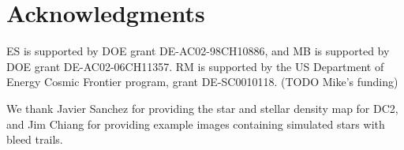 \documentclass[iop, twocolappendix, appendixfloats, numberedappendix, apj]{hackemulateapj}
\begin{document}
%



\section*{Acknowledgments}

ES is supported by DOE grant DE-AC02-98CH10886, and MB is supported by DOE
grant DE-AC02-06CH11357.  RM is supported by the US Department of Energy Cosmic
Frontier program, grant DE-SC0010118.  (TODO Mike's funding)

We thank Javier Sanchez for providing the star and stellar density map for DC2,
and Jim Chiang for providing example images containing simulated stars
with bleed trails.


%
%
%
%


\end{document}
